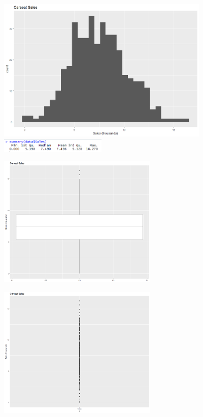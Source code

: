 \begin{frame}[fragile]
\begin{center}
	\includegraphics[width = 4in]{SalesHist.png} \\
	\includegraphics[width = 2in]{SalesSumm.png}
\end{center}

\end{frame}

\begin{frame}
\pause
\begin{center}
	\includegraphics[width = 3in]{SalesBox.png}
\end{center}
\end{frame}

\begin{frame}
\begin{center}
	\includegraphics[width = 3in]{SalesPoints.png}
\end{center}
\end{frame}

